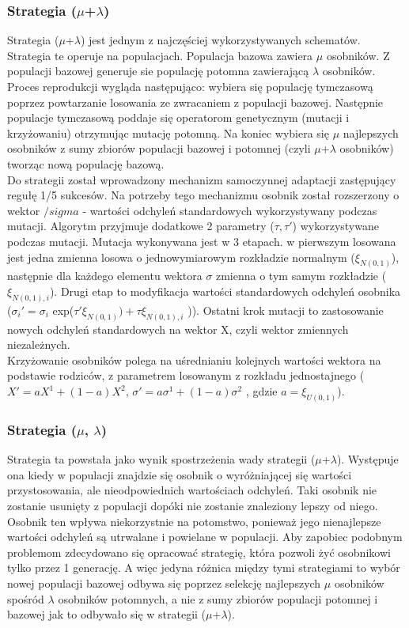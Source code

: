\documentclass[12pt,a4paper]{article}
\begin{document}
\subsubsection{Strategia ($\mu$+$\lambda$)}
\indent Strategia ($\mu$+$\lambda$) jest jednym z najczęściej wykorzystywanych schematów. Strategia te operuje na populacjach. Populacja bazowa zawiera $\mu$ osobników. Z populacji bazowej generuje sie populację potomna zawierającą $\lambda$ osobników. Proces reprodukcji wygląda następująco: wybiera się populację tymczasową poprzez powtarzanie losowania ze zwracaniem z populacji bazowej. Następnie populacje tymczasową poddaje się operatorom genetycznym (mutacji i krzyżowaniu) otrzymując mutację potomną. Na koniec wybiera się $\mu$ najlepszych osobników z sumy zbiorów populacji bazowej i potomnej (czyli $\mu$+$\lambda$ osobników) tworząc nową populację bazową. \\
\indent Do strategii został wprowadzony mechanizm samoczynnej adaptacji zastępujący regułę 1/5 sukcesów. Na potrzeby tego mechanizmu osobnik został rozszerzony o wektor $/sigma$ - wartości odchyleń standardowych wykorzystywany podczas mutacji. Algorytm przyjmuje dodatkowe 2 parametry ($\tau, \tau'$) wykorzystywane podczas mutacji. Mutacja wykonywana jest w 3 etapach. w pierwszym losowana jest jedna zmienna losowa o jednowymiarowym rozkładzie normalnym ($\xi_{N(0,1)}$), następnie dla każdego elementu wektora $\sigma$ zmienna o tym samym rozkładzie ($\xi_{N(0,1),i}$). Drugi etap to modyfikacja wartości standardowych odchyleń osobnika ($\sigma_i' = \sigma_i$ exp($\tau'\xi_{N(0,1)})+\tau\xi_{N(0,1),i}$ )). Ostatni krok mutacji to zastosowanie nowych odchyleń standardowych na wektor X, czyli wektor zmiennych niezależnych. \\
\indent Krzyżowanie osobników polega na uśrednianiu kolejnych wartości wektora na podstawie rodziców, z parametrem losowanym z rozkładu jednostajnego ( $X' = aX^1+(1-a)X^2$, $\sigma' = a\sigma^1+(1-a)\sigma^2$ , gdzie $a = \xi_{U(0,1)}$). \\
\subsubsection{Strategia ($\mu$, $\lambda$)}
\indent Strategia ta powstała jako wynik spostrzeżenia wady strategii ($\mu$+$\lambda$). Występuje ona kiedy w populacji znajdzie się osobnik o wyróżniającej się wartości przystosowania, ale nieodpowiednich wartościach odchyleń. Taki osobnik nie zostanie usunięty z populacji dopóki nie zostanie znaleziony lepszy od niego. Osobnik ten wpływa niekorzystnie na potomstwo, ponieważ jego nienajlepsze wartości odchyleń są utrwalane i powielane w populacji. Aby zapobiec podobnym problemom zdecydowano się opracować strategię, która pozwoli żyć osobnikowi tylko przez 1 generację. A więc jedyna różnica między tymi strategiami to wybór nowej populacji bazowej odbywa się poprzez selekcję najlepszych $\mu$ osobników spośród $\lambda$ osobników potomnych, a nie z sumy zbiorów populacji potomnej i bazowej jak to odbywało się w strategii ($\mu$+$\lambda$).
\newpage
\end{document}
